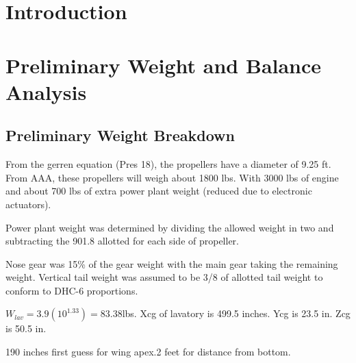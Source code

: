 \documentclass[conf]{new-aiaa}
\begin{document}
\section{Introduction}

\section{Preliminary Weight and Balance Analysis}

\subsection{Preliminary Weight Breakdown}


From the gerren equation (Pres 18), the propellers have a diameter of 9.25 ft. From AAA, these propellers will weigh about 1800 lbs. With 3000 lbs of engine and about 700 lbs of extra power plant weight (reduced due to electronic actuators).

Power plant weight was determined by dividing the allowed weight in two and subtracting the 901.8 allotted for each side of propeller.

Nose gear was 15\% of the gear weight with the main gear taking the remaining weight. Vertical tail weight was assumed to be 3/8 of allotted tail weight to conform to DHC-6 proportions.

$W_{lav} = 3.9(10^{1.33})=83.38$lbs. Xcg of lavatory is 499.5 inches. Ycg is 23.5 in. Zcg is 50.5 in.

190 inches first guess for wing apex.2 feet for distance from bottom.
\end{document}
